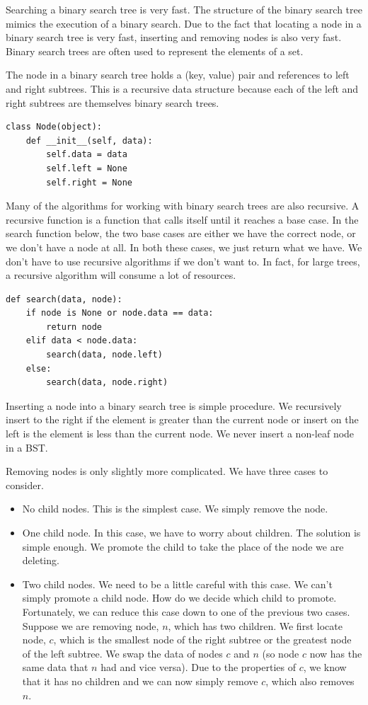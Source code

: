 Searching a binary search tree is very fast.
The structure of the binary search tree mimics the execution of a binary search.
Due to the fact that locating a node in a binary search tree is very fast, inserting and removing nodes is also very fast.  
Binary search trees are often used to represent the elements of a set.

The node in a binary search tree holds a (key, value) pair and references to left and right subtrees. 
This is a recursive data structure because each of the left and right subtrees are themselves binary search trees.
\begin{lstlisting}
class Node(object):
    def __init__(self, data):
        self.data = data
        self.left = None
        self.right = None
\end{lstlisting}
Many of the algorithms for working with binary search trees are also recursive.
A recursive function is a function that calls itself until it reaches a base case.
In the search function below, the two base cases are either we have the correct
node, or we don't have a node at all. 
In both these cases, we just return what we have.
We don't have to use recursive algorithms if we don't want to.  In fact, for large trees, a recursive algorithm will consume a lot of resources.
\begin{lstlisting}
def search(data, node):
    if node is None or node.data == data:
        return node
    elif data < node.data:
        search(data, node.left)
    else:
        search(data, node.right)
\end{lstlisting}

Inserting a node into a binary search tree is simple procedure.
We recursively insert to the right if the element is greater than the current node
or insert on the left is the element is less than the current node.
We never insert a non-leaf node in a BST.

Removing nodes is only slightly more complicated.
We have three cases to consider.
\begin{itemize}
\item No child nodes.  This is the simplest case.  We simply remove the node.
\item One child node.  In this case, we have to worry about children.
The solution is simple enough. 
We promote the child to take the place of the node we are deleting.
\item Two child nodes.  We need to be a little careful with this case.
We can't simply promote a child node.  How do we decide which child to promote.
Fortunately, we can reduce this case down to one of the previous two cases.
Suppose we are removing node, $n$, which has two children.
We first locate node, $c$, which is the smallest node of the right subtree or the greatest node of the left subtree. 
We swap the data of nodes $c$ and $n$ (so node $c$ now has the same data that $n$ had and vice versa).
Due to the properties of $c$, we know that it has no children and we can now simply remove $c$, which also removes $n$.
\end{itemize}

